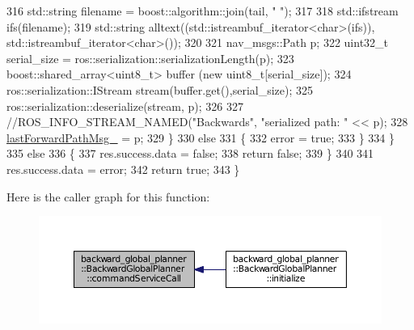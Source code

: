 \begin{DoxyCode}
316             std::string filename = boost::algorithm::join(tail, \textcolor{stringliteral}{" "});
317 
318             std::ifstream ifs(filename);
319             std::string alltext((std::istreambuf\_iterator<char>(ifs)), std::istreambuf\_iterator<char>());
320 
321             nav\_msgs::Path p;
322             uint32\_t serial\_size = ros::serialization::serializationLength(p);
323             boost::shared\_array<uint8\_t> buffer (\textcolor{keyword}{new} uint8\_t[serial\_size]);
324             ros::serialization::IStream stream(buffer.get(),serial\_size);
325             ros::serialization::deserialize(stream, p);
326 
327             \textcolor{comment}{//ROS\_INFO\_STREAM\_NAMED("Backwards", "serialized path: " << p);}
328             \hyperlink{classbackward__global__planner_1_1BackwardGlobalPlanner_a2fe940d13931d4e6e27e3c3d5e5a7db8}{lastForwardPathMsg\_} = p;
329         \}
330         \textcolor{keywordflow}{else}
331         \{
332             error = \textcolor{keyword}{true};
333         \}
334     \}
335     \textcolor{keywordflow}{else}
336     \{
337         res.success.data = \textcolor{keyword}{false};
338         \textcolor{keywordflow}{return} \textcolor{keyword}{false};
339     \}
340 
341     res.success.data = error;
342     \textcolor{keywordflow}{return} \textcolor{keyword}{true};
343 \}
\end{DoxyCode}


Here is the caller graph for this function\+:
\nopagebreak
\begin{figure}[H]
\begin{center}
\leavevmode
\includegraphics[width=350pt]{classbackward__global__planner_1_1BackwardGlobalPlanner_a2c317353dfc5afdd585c26a7c18abb62_icgraph}
\end{center}
\end{figure}


